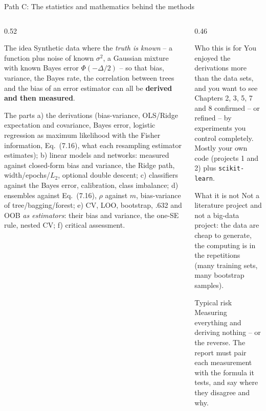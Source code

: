 \documentclass[10pt,aspectratio=169]{beamer}
\begin{document}
\begin{frame}{Path C: The statistics and mathematics behind the methods}
\scriptsize
\begin{columns}[T]
\begin{column}{0.52\textwidth}
\begin{block}{The idea}
Synthetic data where the \emph{truth is known} -- a function plus noise of
known $\sigma^2$, a Gaussian mixture with known Bayes error
$\Phi(-\Delta/2)$ -- so that bias, variance, the Bayes rate, the correlation
between trees and the bias of an error estimator can all be \textbf{derived
and then measured}.
\end{block}
\begin{block}{The parts}
a) the derivations (bias-variance, OLS/Ridge expectation and covariance,
Bayes error, logistic regression as maximum likelihood with the Fisher
information, Eq.~(7.16), what each resampling estimator estimates);
b) linear models and networks: measured against closed-form bias and
variance, the Ridge path, width/epochs/$L_2$, optional double descent;
c) classifiers against the Bayes error, calibration, class imbalance;
d) ensembles against Eq.~(7.16), $\rho$ against $m$, bias-variance of
tree/bagging/forest; e) CV, LOO, bootstrap, .632 and OOB \emph{as
estimators}: their bias and variance, the one-SE rule, nested CV;
f) critical assessment.
\end{block}
\end{column}
\begin{column}{0.46\textwidth}
\begin{block}{Who this is for}
You enjoyed the derivations more than the data sets, and you want to see
Chapters 2, 3, 5, 7 and 8 confirmed -- or refined -- by experiments you
control completely.  Mostly your own code (projects 1 and 2) plus
\texttt{scikit-learn}.
\end{block}
\begin{block}{What it is not}
Not a literature project and not a big-data project: the data are cheap to
generate, the computing is in the repetitions (many training sets, many
bootstrap samples).
\end{block}
\begin{block}{Typical risk}
Measuring everything and deriving nothing -- or the reverse.  The report
must pair each measurement with the formula it tests, and say where they
disagree and why.
\end{block}
\end{column}
\end{columns}
\end{frame}
\end{document}
